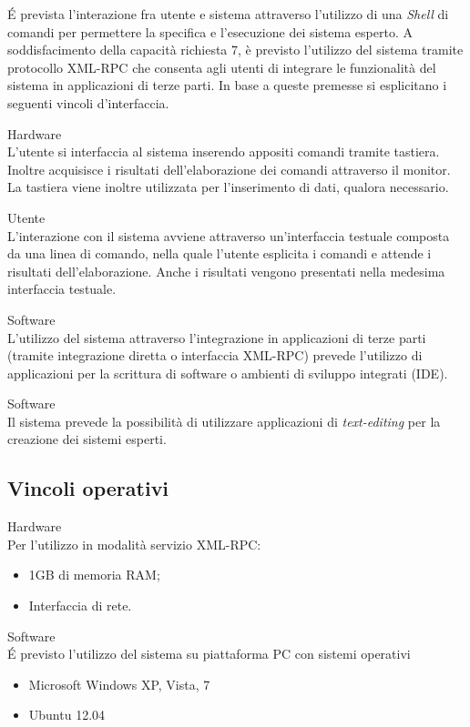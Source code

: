 \'E prevista l'interazione fra utente e sistema attraverso l'utilizzo di una \emph{Shell} di comandi per permettere la specifica e l'esecuzione dei sistema esperto.  A soddisfacimento della capacità richiesta 7, è previsto l'utilizzo del sistema tramite protocollo XML-RPC che consenta agli utenti di integrare le funzionalità del sistema in applicazioni di terze parti. In base a queste premesse si esplicitano i seguenti vincoli d'interfaccia.
\vincolistart
	\item Hardware\\	
	L'utente si interfaccia al sistema inserendo appositi comandi tramite tastiera. Inoltre acquisisce i risultati dell'elaborazione dei comandi attraverso il monitor. La tastiera viene inoltre utilizzata per l'inserimento di dati, qualora necessario.
	
	\item Utente\\
	L'interazione con il sistema avviene attraverso un'interfaccia testuale composta da una linea di comando, nella quale l'utente esplicita i comandi e attende i risultati dell'elaborazione. Anche i risultati vengono presentati nella medesima interfaccia testuale.
	
	\item Software\\
	L'utilizzo del sistema attraverso l'integrazione in applicazioni di terze parti (tramite integrazione diretta o interfaccia XML-RPC) prevede l'utilizzo di applicazioni per la scrittura di software o ambienti di sviluppo integrati (IDE).
	
	\item Software\\
	Il sistema prevede la possibilità di utilizzare applicazioni di \emph{text-editing} per la creazione dei sistemi esperti.
	
\vincoliend

\subsection{Vincoli operativi}

\vincolistart
	\item Hardware\\
	Per l'utilizzo in modalità servizio XML-RPC:
	\begin{itemize}
		\item 1GB di memoria RAM;
		\item Interfaccia di rete.
	\end{itemize}
	\item Software\\
	\'E previsto l'utilizzo del sistema su piattaforma PC con sistemi operativi
	\begin{itemize}
		\item Microsoft Windows XP, Vista, 7
		\item Ubuntu 12.04
	\end{itemize}
\vincoliend

